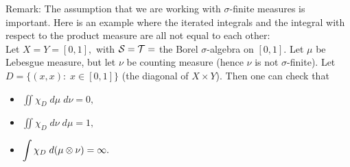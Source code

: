 \noindent *Remark: The assumption that we are working with $\sigma$-finite measures is important. Here is an example where the iterated integrals and the integral with respect to the product measure are all not equal to each other: \\

\noindent Let $X=Y=[0,1],$ with $\mathcal{S}=\mathcal{T}=$ the Borel $\sigma$-algebra on $[0,1].$ Let $\mu$ be Lebesgue measure, but let $\nu$ be counting measure (hence $\nu$ is not $\sigma$-finite). Let $D=\{(x,x):\;x\in[0,1]\}$ (the diagonal of $X\times Y$). Then one can check that
\begin{itemize}
\item $\displaystyle\iint\chi_D\;d\mu\;d\nu=0,$
\item $\displaystyle\iint\chi_D\;d\nu\;d\mu=1,$
\item $\displaystyle\int\chi_D\;d(\mu\otimes\nu)=\infty.$
\end{itemize}

















